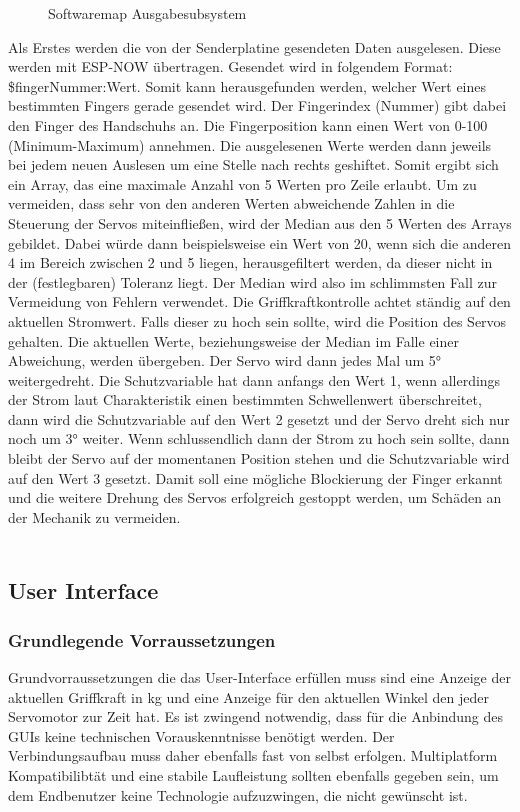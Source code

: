 \documentclass[titlepage,12pt,twoside]{article}
\begin{document}
\begin{figure}[H]
	\centering
	\caption{Softwaremap Ausgabesubsystem}
	\label{fig:Softwaremap_3}	
\end{figure}
\hfill \break
Als Erstes werden die von der Senderplatine gesendeten Daten ausgelesen. Diese 
werden mit ESP-NOW übertragen. Gesendet wird in folgendem Format: 
\$fingerNummer:Wert. Somit kann herausgefunden werden, welcher Wert eines 
bestimmten Fingers gerade gesendet wird. Der Fingerindex (Nummer) gibt dabei den 
Finger des Handschuhs an. Die Fingerposition kann einen Wert von 0-100 
(Minimum-Maximum) annehmen. Die ausgelesenen Werte werden dann jeweils bei jedem 
neuen Auslesen um eine Stelle nach rechts geshiftet. Somit ergibt sich ein Array, 
das eine maximale Anzahl von 5 Werten pro Zeile erlaubt. Um zu vermeiden, dass 
sehr von den anderen Werten abweichende Zahlen in die Steuerung der Servos miteinfließen, 
wird der Median aus den 5 Werten des Arrays gebildet. Dabei würde dann beispielsweise 
ein Wert von 20, wenn sich die anderen 4 im Bereich zwischen 2 und 5 liegen, 
herausgefiltert werden, da dieser nicht in der (festlegbaren) Toleranz liegt. 
Der Median wird also im schlimmsten Fall zur Vermeidung von Fehlern verwendet. 
Die Griffkraftkontrolle achtet ständig auf den aktuellen Stromwert. Falls dieser 
zu hoch sein sollte, wird die Position des Servos gehalten. Die aktuellen Werte, 
beziehungsweise der Median im Falle einer Abweichung, werden übergeben. Der 
Servo wird dann jedes Mal um 5° weitergedreht. Die Schutzvariable hat dann anfangs 
den Wert 1, wenn allerdings der Strom laut Charakteristik einen bestimmten Schwellenwert 
überschreitet, dann wird die Schutzvariable auf den Wert 2 gesetzt und der Servo 
dreht sich nur noch um 3° weiter. Wenn schlussendlich dann der Strom zu hoch sein 
sollte, dann bleibt der Servo auf der momentanen Position stehen und die Schutzvariable 
wird auf den Wert 3 gesetzt. Damit soll eine mögliche Blockierung der Finger 
erkannt und die weitere Drehung des Servos erfolgreich gestoppt werden, um 
Schäden an der Mechanik zu vermeiden. \\
\\

\newpage
\subsection{User Interface}
\label{chap:User Interface}

\subsubsection{Grundlegende Vorraussetzungen}
Grundvorraussetzungen die das User-Interface erfüllen muss sind eine Anzeige der aktuellen Griffkraft in kg und eine Anzeige für
den aktuellen Winkel den jeder Servomotor zur Zeit hat. Es ist zwingend notwendig, dass für die Anbindung des GUIs keine technischen
Vorauskenntnisse benötigt werden. Der Verbindungsaufbau muss daher ebenfalls fast von selbst erfolgen. Multiplatform Kompatibilibtät
und eine stabile Laufleistung sollten ebenfalls gegeben sein, um dem Endbenutzer keine Technologie aufzuzwingen, die nicht gewünscht ist.
\end{document}
